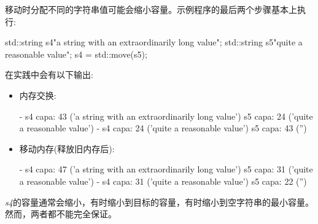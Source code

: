 移动时分配不同的字符串值可能会缩小容量。示例程序的最后两个步骤基本上执行:

\begin{cppcode}
std::string s4{"a string with an extraordinarily long value"};
std::string s5{"quite a reasonable value"};
s4 = std::move(s5);
\end{cppcode}

在实践中会有以下输出:

\begin{itemize}
	\item 内存交换:
	\begin{outputcode}
- s4 capa: 43 ('a string with an extraordinarily long value')
s5 capa: 24 ('quite a reasonable value')
- s4 capa: 24 ('quite a reasonable value')
s5 capa: 43 ('')
	\end{outputcode}
	\item 移动内存(释放旧内存后):
	\begin{outputcode}
- s4 capa: 47 ('a string with an extraordinarily long value')
s5 capa: 31 ('quite a reasonable value')
- s4 capa: 31 ('quite a reasonable value')
s5 capa: 22 ('')
	\end{outputcode}
\end{itemize}

\textit{s4}的容量通常会缩小，有时缩小到目标的容量，有时缩小到空字符串的最小容量。然而，两者都不能完全保证。
